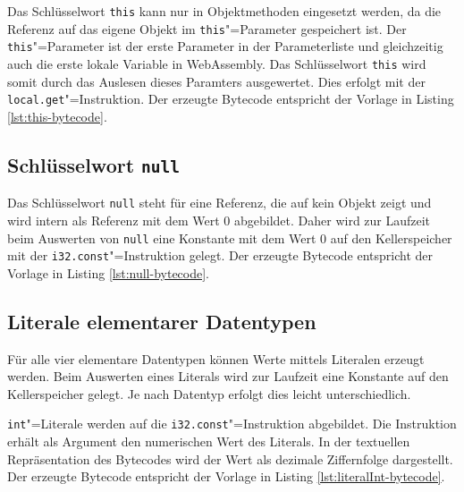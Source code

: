 Das Schlüsselwort \lstinline{this} kann nur in Objektmethoden eingesetzt werden, da die Referenz auf das eigene Objekt im \lstinline{this}"=Parameter gespeichert ist. Der \lstinline{this}"=Parameter ist der erste Parameter in der Parameterliste und gleichzeitig auch die erste lokale Variable in WebAssembly. Das Schlüsselwort \lstinline{this} wird somit durch das Auslesen dieses Paramters ausgewertet. Dies erfolgt mit der \lstinline{local.get}"=Instruktion. Der erzeugte Bytecode entspricht der Vorlage in Listing \ref{lst:this-bytecode}.

\pagebreak


\subsection{Schlüsselwort \lstinline{null}}

Das Schlüsselwort \lstinline{null} steht für eine Referenz, die auf kein Objekt zeigt und wird intern als Referenz mit dem Wert $0$ abgebildet. Daher wird zur Laufzeit beim Auswerten von \lstinline{null} eine Konstante mit dem Wert $0$ auf den Kellerspeicher mit der \lstinline{i32.const}"=Instruktion gelegt. Der erzeugte Bytecode entspricht der Vorlage in Listing \ref{lst:null-bytecode}.



\subsection{Literale elementarer Datentypen}

Für alle vier elementare Datentypen können Werte mittels Literalen erzeugt werden. Beim Auswerten eines Literals wird zur Laufzeit eine Konstante auf den Kellerspeicher gelegt. Je nach Datentyp erfolgt dies leicht unterschiedlich.

\lstinline{int}"=Literale werden auf die \lstinline{i32.const}"=Instruktion abgebildet. Die Instruktion erhält als Argument den numerischen Wert des Literals. In der textuellen Repräsentation des Bytecodes wird der Wert als dezimale Ziffernfolge dargestellt. Der erzeugte Bytecode entspricht der Vorlage in Listing \ref{lst:literalInt-bytecode}.



